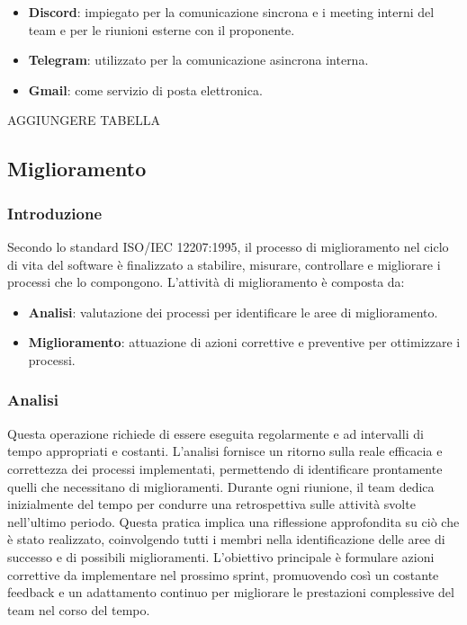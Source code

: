 \begin{itemize}
    \item \textbf{Discord}: impiegato per la comunicazione sincrona e i meeting interni del team e per le riunioni esterne con il proponente.
    \item \textbf{Telegram}: utilizzato per la comunicazione asincrona interna.
    \item \textbf{Gmail}: come servizio di posta elettronica.
\end{itemize}

AGGIUNGERE TABELLA

\subsection{Miglioramento}
\subsubsection{Introduzione}
Secondo lo standard ISO/IEC 12207:1995, il processo di miglioramento nel ciclo di vita del software è finalizzato a stabilire, misurare, controllare e migliorare i processi che lo compongono. L’attività di miglioramento è composta da:
\begin{itemize}
    \item \textbf{Analisi}: valutazione dei processi per identificare le aree di miglioramento.
    \item \textbf{Miglioramento}: attuazione di azioni correttive e preventive per ottimizzare i processi.
\end{itemize}
\subsubsection{Analisi}
Questa operazione richiede di essere eseguita regolarmente e ad intervalli di tempo appropriati e costanti. L’analisi fornisce un ritorno sulla reale efficacia e correttezza dei processi implementati, permettendo di identificare prontamente quelli che necessitano di miglioramenti.
Durante ogni riunione, il team dedica inizialmente del tempo per condurre una retrospettiva sulle attività svolte nell’ultimo periodo. Questa pratica implica una riflessione approfondita su ciò che è stato realizzato, coinvolgendo tutti i membri nella identificazione delle aree di successo e di possibili miglioramenti.
L’obiettivo principale è formulare azioni correttive da implementare nel prossimo sprint, promuovendo così un costante feedback e un adattamento continuo per migliorare le prestazioni complessive del team nel corso del tempo.
